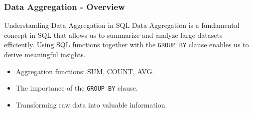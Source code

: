 \documentclass[aspectratio=169]{beamer}
\begin{document}
\begin{frame}[fragile]
    \frametitle{Data Aggregation - Overview}
    \begin{block}{Understanding Data Aggregation in SQL}
        Data Aggregation is a fundamental concept in SQL that allows us to summarize and analyze large datasets efficiently. 
        Using SQL functions together with the \texttt{GROUP BY} clause enables us to derive meaningful insights.
    \end{block}
    
    \begin{itemize}
        \item Aggregation functions: SUM, COUNT, AVG.
        \item The importance of the \texttt{GROUP BY} clause.
        \item Transforming raw data into valuable information.
    \end{itemize}
\end{frame}
\end{document}
